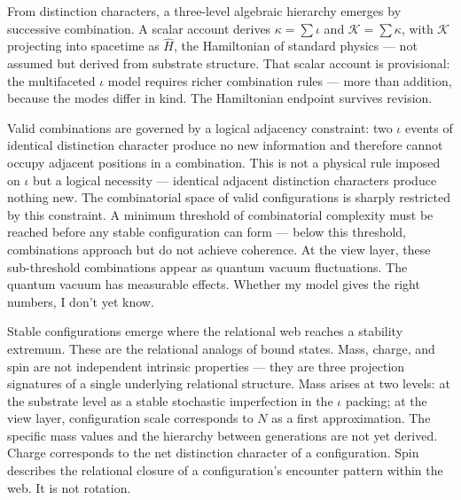 \documentclass[11pt,letterpaper]{article}
\newcommand{\Kappa}{\mathcal{K}}
\begin{document}
From distinction characters, a three-level algebraic hierarchy emerges by successive combination. A scalar account derives \(\kappa = \sum \iota\) and \(\Kappa = \sum \kappa\), with \(\Kappa\) projecting into spacetime as \(\hat{H}\), the Hamiltonian of standard physics --- not assumed but derived from substrate structure. That scalar account is provisional: the multifaceted \(\iota\) model requires richer combination rules --- more than addition, because the modes differ in kind. The Hamiltonian endpoint survives revision.

Valid combinations are governed by a logical adjacency constraint: two \(\iota\) events of identical distinction character produce no new information and therefore cannot occupy adjacent positions in a combination. This is not a physical rule imposed on \(\iota\) but a logical necessity --- identical adjacent distinction characters produce nothing new. The combinatorial space of valid configurations is sharply restricted by this constraint. A minimum threshold of combinatorial complexity must be reached before any stable configuration can form --- below this threshold, combinations approach but do not achieve coherence. At the view layer, these sub-threshold combinations appear as quantum vacuum fluctuations. The quantum vacuum has measurable effects. Whether my model gives the right numbers, I don't yet know.

Stable configurations emerge where the relational web reaches a stability extremum. These are the relational analogs of bound states. Mass, charge, and spin are not independent intrinsic properties --- they are three projection signatures of a single underlying relational structure. Mass arises at two levels: at the substrate level as a stable stochastic imperfection in the \(\iota\) packing; at the view layer, configuration scale corresponds to \(N\) as a first approximation. The specific mass values and the hierarchy between generations are not yet derived. Charge corresponds to the net distinction character of a configuration. Spin describes the relational closure of a configuration's encounter pattern within the web. It is not rotation.
\end{document}
